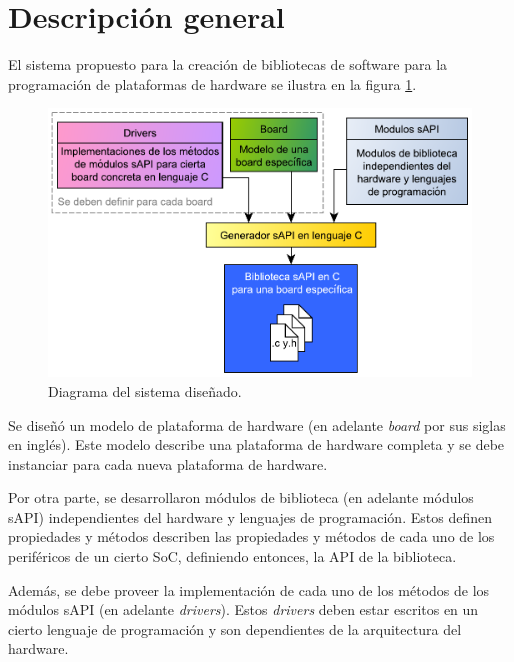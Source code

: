 \section{Descripción general}
\label{sec:descripGralDiseno}

El sistema propuesto para la creación de bibliotecas de software para la programación de plataformas de hardware se ilustra en la figura \ref{fig:sapi_gen}.

\begin{figure}[!htbp]
\begin{center}  %
\includegraphics*[width=14cm]{Figures/sapi_gen.pdf}
\par\caption{Diagrama del sistema diseñado.}\label{fig:sapi_gen}
\end{center}
\end{figure}

Se diseñó un modelo de plataforma de hardware (en adelante \emph{board} por sus siglas en inglés). Este modelo describe una plataforma de hardware completa y se debe instanciar para cada nueva plataforma de hardware.

Por otra parte, se desarrollaron módulos de biblioteca (en adelante módulos sAPI) independientes del hardware y lenguajes de programación. Estos definen propiedades y métodos describen las propiedades y métodos de cada uno de los periféricos de un cierto SoC, definiendo entonces, la API de la biblioteca.

Además, se debe proveer la implementación de cada uno de los métodos de los módulos sAPI (en adelante \emph{drivers}). Estos \emph{drivers} deben estar escritos en un cierto lenguaje de programación y son dependientes de la arquitectura del hardware.


